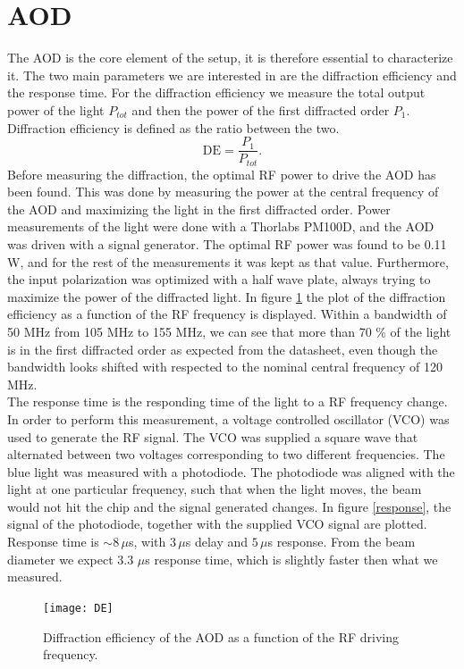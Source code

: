 \section{AOD}
The AOD is the core element of the setup, it is therefore essential to characterize it. The two main parameters we are interested in are the diffraction efficiency and the response time. For the diffraction efficiency we measure the total output power of the light $P_{tot}$ and then the power of the first diffracted order $P_{1}$. Diffraction efficiency is defined as the ratio between the two.
\begin{equation}
\text{DE} = \frac{P_1}{P_{tot}}.
\end{equation}
Before measuring the diffraction, the optimal RF power to drive the AOD has been found. This was done by measuring the power at the central frequency of the AOD and maximizing the light in the first diffracted order. Power measurements of the light were done with a Thorlabs PM100D, and the AOD was driven with a signal generator. The optimal RF power was found to be 0.11 W, and for the rest of the measurements it was kept as that value. Furthermore, the input polarization was optimized with a half wave plate, always trying to maximize the power of the diffracted light. In figure \ref{DE} the plot of the diffraction efficiency as a function of the RF frequency is displayed. Within a bandwidth of 50 MHz from 105 MHz to 155 MHz, we can see that more than 70 \% of the light is in the first diffracted order as expected from the datasheet, even though the bandwidth looks shifted with respected to the nominal central frequency of 120 MHz.\\
The response time is the responding time of the light to a RF frequency change. In order to perform this measurement, a voltage controlled oscillator (VCO) was used to generate the RF signal. The VCO was supplied a square wave that alternated between two voltages corresponding to two different frequencies. The blue light was measured with a photodiode. The photodiode was aligned with the light at one particular frequency, such that when the light moves, the beam would not hit the chip and the signal generated changes. In figure \ref{response}, the signal of the photodiode, together with the supplied VCO signal are plotted. Response time is $\sim 8\,\mu$s, with $3\,\mu$s delay and $5\,\mu$s response. From the beam diameter we expect 3.3 $\mu$s response time, which is slightly faster then what we measured.

\begin{figure}
\centering
\texttt{[image: DE]}
\caption{Diffraction efficiency of the AOD as a function of the RF driving frequency.}
\label{DE}
\end{figure}

